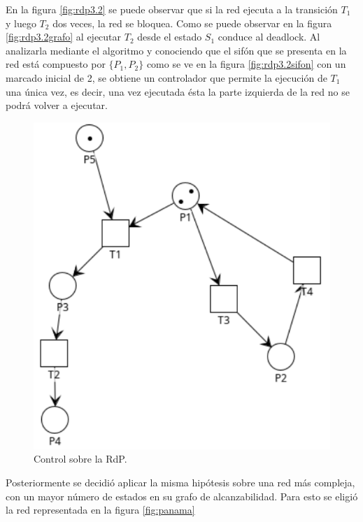 En la figura \ref{fig:rdp3.2} se puede observar que si la red ejecuta a la transición $T_1$ y luego $T_2$ dos veces, la red se bloquea. Como se puede observar en la figura \ref{fig:rdp3.2grafo} al ejecutar $T_2$ desde el estado $S_1$ conduce al deadlock. Al analizarla mediante el algoritmo y conociendo que el sifón que se presenta en la red está compuesto por $\{P_1,P_2\}$ como se ve en la figura \ref{fig:rdp3.2sifon} con un marcado inicial de 2, se obtiene un controlador que permite la ejecución de $T_1$ una única vez, es decir, una vez ejecutada ésta la parte izquierda de la red no se podrá volver a ejecutar.

\begin{figure}[H]
	\centering
	\includegraphics[scale=0.55]{Figures/algoritmo2/2.png}
	\caption{Control sobre la RdP.}
	\label{fig:rdp3.3}
  \end{figure}

\bigskip
Posteriormente se decidió aplicar la misma hipótesis sobre una red más compleja, con un mayor número de estados en su grafo de alcanzabilidad. Para esto se eligió la red representada en la figura \ref{fig:panama}

